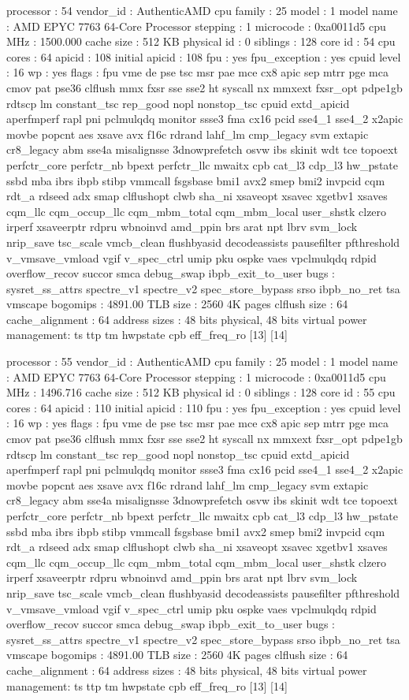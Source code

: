 processor	: 54
vendor_id	: AuthenticAMD
cpu family	: 25
model		: 1
model name	: AMD EPYC 7763 64-Core Processor
stepping	: 1
microcode	: 0xa0011d5
cpu MHz		: 1500.000
cache size	: 512 KB
physical id	: 0
siblings	: 128
core id		: 54
cpu cores	: 64
apicid		: 108
initial apicid	: 108
fpu		: yes
fpu_exception	: yes
cpuid level	: 16
wp		: yes
flags		: fpu vme de pse tsc msr pae mce cx8 apic sep mtrr pge mca cmov pat pse36 clflush mmx fxsr sse sse2 ht syscall nx mmxext fxsr_opt pdpe1gb rdtscp lm constant_tsc rep_good nopl nonstop_tsc cpuid extd_apicid aperfmperf rapl pni pclmulqdq monitor ssse3 fma cx16 pcid sse4_1 sse4_2 x2apic movbe popcnt aes xsave avx f16c rdrand lahf_lm cmp_legacy svm extapic cr8_legacy abm sse4a misalignsse 3dnowprefetch osvw ibs skinit wdt tce topoext perfctr_core perfctr_nb bpext perfctr_llc mwaitx cpb cat_l3 cdp_l3 hw_pstate ssbd mba ibrs ibpb stibp vmmcall fsgsbase bmi1 avx2 smep bmi2 invpcid cqm rdt_a rdseed adx smap clflushopt clwb sha_ni xsaveopt xsavec xgetbv1 xsaves cqm_llc cqm_occup_llc cqm_mbm_total cqm_mbm_local user_shstk clzero irperf xsaveerptr rdpru wbnoinvd amd_ppin brs arat npt lbrv svm_lock nrip_save tsc_scale vmcb_clean flushbyasid decodeassists pausefilter pfthreshold v_vmsave_vmload vgif v_spec_ctrl umip pku ospke vaes vpclmulqdq rdpid overflow_recov succor smca debug_swap ibpb_exit_to_user
bugs		: sysret_ss_attrs spectre_v1 spectre_v2 spec_store_bypass srso ibpb_no_ret tsa vmscape
bogomips	: 4891.00
TLB size	: 2560 4K pages
clflush size	: 64
cache_alignment	: 64
address sizes	: 48 bits physical, 48 bits virtual
power management: ts ttp tm hwpstate cpb eff_freq_ro [13] [14]

processor	: 55
vendor_id	: AuthenticAMD
cpu family	: 25
model		: 1
model name	: AMD EPYC 7763 64-Core Processor
stepping	: 1
microcode	: 0xa0011d5
cpu MHz		: 1496.716
cache size	: 512 KB
physical id	: 0
siblings	: 128
core id		: 55
cpu cores	: 64
apicid		: 110
initial apicid	: 110
fpu		: yes
fpu_exception	: yes
cpuid level	: 16
wp		: yes
flags		: fpu vme de pse tsc msr pae mce cx8 apic sep mtrr pge mca cmov pat pse36 clflush mmx fxsr sse sse2 ht syscall nx mmxext fxsr_opt pdpe1gb rdtscp lm constant_tsc rep_good nopl nonstop_tsc cpuid extd_apicid aperfmperf rapl pni pclmulqdq monitor ssse3 fma cx16 pcid sse4_1 sse4_2 x2apic movbe popcnt aes xsave avx f16c rdrand lahf_lm cmp_legacy svm extapic cr8_legacy abm sse4a misalignsse 3dnowprefetch osvw ibs skinit wdt tce topoext perfctr_core perfctr_nb bpext perfctr_llc mwaitx cpb cat_l3 cdp_l3 hw_pstate ssbd mba ibrs ibpb stibp vmmcall fsgsbase bmi1 avx2 smep bmi2 invpcid cqm rdt_a rdseed adx smap clflushopt clwb sha_ni xsaveopt xsavec xgetbv1 xsaves cqm_llc cqm_occup_llc cqm_mbm_total cqm_mbm_local user_shstk clzero irperf xsaveerptr rdpru wbnoinvd amd_ppin brs arat npt lbrv svm_lock nrip_save tsc_scale vmcb_clean flushbyasid decodeassists pausefilter pfthreshold v_vmsave_vmload vgif v_spec_ctrl umip pku ospke vaes vpclmulqdq rdpid overflow_recov succor smca debug_swap ibpb_exit_to_user
bugs		: sysret_ss_attrs spectre_v1 spectre_v2 spec_store_bypass srso ibpb_no_ret tsa vmscape
bogomips	: 4891.00
TLB size	: 2560 4K pages
clflush size	: 64
cache_alignment	: 64
address sizes	: 48 bits physical, 48 bits virtual
power management: ts ttp tm hwpstate cpb eff_freq_ro [13] [14]

